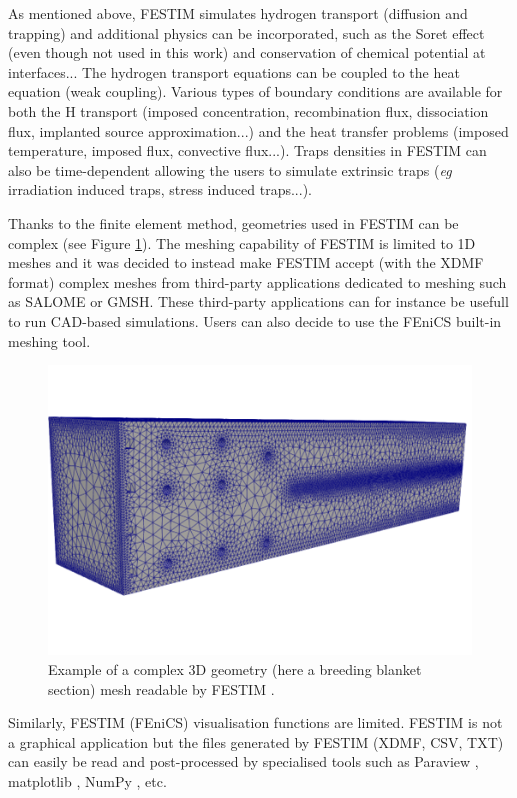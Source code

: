 As mentioned above, FESTIM simulates hydrogen transport (diffusion and trapping) and additional physics can be incorporated, such as the Soret effect (even though not used in this work) and conservation of chemical potential at interfaces...
The hydrogen transport equations can be coupled to the heat equation (weak coupling).
Various types of boundary conditions are available for both the H transport (imposed concentration, recombination flux, dissociation flux, implanted source approximation...) and the heat transfer problems (imposed temperature, imposed flux, convective flux...).
Traps densities in FESTIM can also be time-dependent allowing the users to simulate extrinsic traps (\textit{eg} irradiation induced traps, stress induced traps...).

Thanks to the finite element method, geometries used in FESTIM can be complex (see Figure \ref{fig: example mesh}).
The meshing capability of FESTIM is limited to 1D meshes and it was decided to instead make FESTIM accept (with the XDMF format) complex meshes from third-party applications dedicated to meshing such as SALOME or GMSH.
These third-party applications can for instance be usefull to run CAD-based simulations.
Users can also decide to use the FEniCS built-in meshing tool.

\begin{figure}
    \centering
    \includegraphics[width=0.5\linewidth]{Figures/Chapter2/example_mesh.png}
    \caption{Example of a complex 3D geometry (here a breeding blanket section) mesh readable by FESTIM \cite{dark_influence_2021}.}
    \label{fig: example mesh}
\end{figure}

Similarly, FESTIM (FEniCS) visualisation functions are limited.
FESTIM is not a graphical application but the files generated by FESTIM (XDMF, CSV, TXT) can easily be read and post-processed by specialised tools such as Paraview , matplotlib , NumPy , etc.


